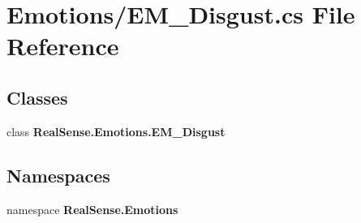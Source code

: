 \section{Emotions/\+E\+M\+\_\+\+Disgust.cs File Reference}
\label{_e_m___disgust_8cs}
\subsection*{Classes}
\begin{DoxyCompactItemize}
\item 
class \textbf{ Real\+Sense.\+Emotions.\+E\+M\+\_\+\+Disgust}
\end{DoxyCompactItemize}
\subsection*{Namespaces}
\begin{DoxyCompactItemize}
\item 
namespace \textbf{ Real\+Sense.\+Emotions}
\end{DoxyCompactItemize}
